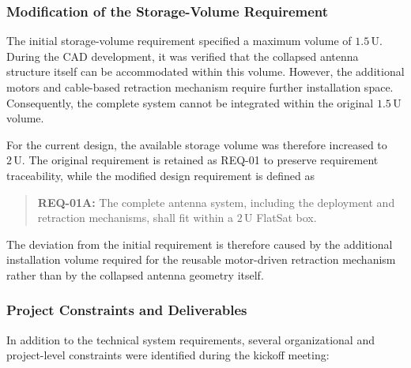 \subsubsection{Modification of the Storage-Volume Requirement}

The initial storage-volume requirement specified a maximum volume of
$1.5\,\mathrm{U}$. During the CAD development, it was verified that the
collapsed antenna structure itself can be accommodated within this volume.
However, the additional motors and cable-based retraction mechanism require
further installation space. Consequently, the complete system cannot be
integrated within the original $1.5\,\mathrm{U}$ volume.

For the current design, the available storage volume was therefore increased
to $2\,\mathrm{U}$. The original requirement is retained as REQ-01 to preserve
requirement traceability, while the modified design requirement is defined as

\begin{quote}
	\textbf{REQ-01A:} The complete antenna system, including the deployment
	and retraction mechanisms, shall fit within a $2\,\mathrm{U}$ FlatSat box.
\end{quote}

The deviation from the initial requirement is therefore caused by the
additional installation volume required for the reusable motor-driven
retraction mechanism rather than by the collapsed antenna geometry itself.


\subsubsection{Project Constraints and Deliverables}

In addition to the technical system requirements, several organizational and
project-level constraints were identified during the kickoff meeting:

